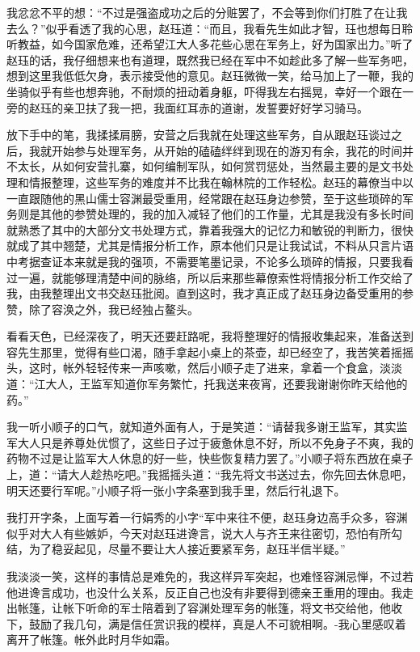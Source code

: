 我忿忿不平的想：“不过是强盗成功之后的分赃罢了，不会等到你们打胜了在让我去么？”似乎看透了我的心思，赵珏道：“而且，我看先生如此才智，珏也想每日聆听教益，如今国家危难，还希望江大人多花些心思在军务上，好为国家出力。”听了赵珏的话，我仔细想来也有道理，既然我已经在军中不如趁此多了解一些军务吧，想到这里我低低欠身，表示接受他的意见。赵珏微微一笑，给马加上了一鞭，我的坐骑似乎有些也想奔驰，不耐烦的扭动着身躯，吓得我左右摇晃，幸好一个跟在一旁的赵珏的亲卫扶了我一把，我面红耳赤的道谢，发誓要好好学习骑马。

放下手中的笔，我揉揉肩膀，安营之后我就在处理这些军务，自从跟赵珏谈过之后，我就开始参与处理军务，从开始的磕磕绊绊到现在的游刃有余，我花的时间并不太长，从如何安营扎寨，如何编制军队，如何赏罚惩处，当然最主要的是文书处理和情报整理，这些军务的难度并不比我在翰林院的工作轻松。赵珏的幕僚当中以一直跟随他的黑山儒士容渊最受重用，经常跟在赵珏身边参赞，至于这些琐碎的军务则是其他的参赞处理的，我的加入减轻了他们的工作量，尤其是我没有多长时间就熟悉了其中的大部分文书处理方式，靠着我强大的记忆力和敏锐的判断力，很快就成了其中翘楚，尤其是情报分析工作，原本他们只是让我试试，不料从只言片语中考据查证本来就是我的强项，不需要笔墨记录，不论多么琐碎的情报，只要我看过一遍，就能够理清楚中间的脉络，所以后来那些幕僚索性将情报分析工作交给了我，由我整理出文书交赵珏批阅。直到这时，我才真正成了赵珏身边备受重用的参赞，除了容涣之外，我已经独占鳌头。

看看天色，已经深夜了，明天还要赶路呢，我将整理好的情报收集起来，准备送到容先生那里，觉得有些口渴，随手拿起小桌上的茶壶，却已经空了，我苦笑着摇摇头，这时，帐外轻轻传来一声咳嗽，然后小顺子走了进来，拿着一个食盒，淡淡道：“江大人，王监军知道你军务繁忙，托我送来夜宵，还要我谢谢你昨天给他的药。”

我一听小顺子的口气，就知道外面有人，于是笑道：“请替我多谢王监军，其实监军大人只是养尊处优惯了，这些日子过于疲惫休息不好，所以不免身子不爽，我的药物不过是让监军大人休息的好一些，快些恢复精力罢了。”小顺子将东西放在桌子上，道：“请大人趁热吃吧。”我摇摇头道：“我先将文书送过去，你先回去休息吧，明天还要行军呢。”小顺子将一张小字条塞到我手里，然后行礼退下。

我打开字条，上面写着一行娟秀的小字“军中来往不便，赵珏身边高手众多，容渊似乎对大人有些嫉妒，今天对赵珏进谗言，说大人与齐王来往密切，恐怕有所勾结，为了稳妥起见，尽量不要让大人接近要紧军务，赵珏半信半疑。”

我淡淡一笑，这样的事情总是难免的，我这样异军突起，也难怪容渊忌惮，不过若他进谗言成功，也没什么关系，反正自己也没有非要得到德亲王重用的理由。我走出帐篷，让帐下听命的军士陪着到了容渊处理军务的帐篷，将文书交给他，他收下，鼓励了我几句，满是信任赏识我的模样，真是人不可貌相啊。-我心里感叹着离开了帐篷。帐外此时月华如霜。

